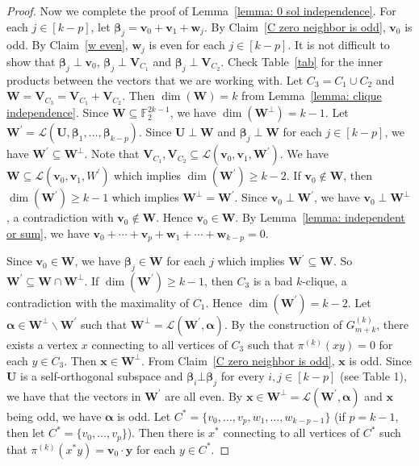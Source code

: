 \documentclass[
final
]{dmtcs-episciences}
\begin{document}
\begin{proof}
Now we complete the proof of Lemma~\ref{lemma: 0 sol independence}. For each $j\in[k-p]$, let $\boldsymbol{\beta}_j=\textbf{v}_0+\textbf{v}_1+\textbf{w}_j$. By Claim~\ref{C zero neighbor is odd},  $\textbf{v}_{0}$ is odd. By Claim~\ref{w even}, $\textbf{w}_j$ is even for each $j\in[k-p]$.
 It is not difficult to show that  $\boldsymbol{\beta}_j\perp \textbf{v}_{0}$, $\boldsymbol{\beta}_j\perp \textbf{V}_{C_1}$ and $\boldsymbol{\beta}_j\perp \textbf{V}_{C_2}$. Check Table~\ref{tab} for the inner products between the vectors that we are working with.
Let $C_3=C_1\cup C_2$ and $\mathbf{W}=\textbf{V}_{C_3}=\textbf{V}_{C_1}+\textbf{V}_{C_2}$. Then  $\dim(\mathbf{W})=k$ from Lemma~\ref{lemma: clique independence}. Since $\mathbf{W} \subseteq  \mathbb{F}_2^{2k-1}$, we have  $\dim(\mathbf{W} ^{\perp})=k-1$. Let $\mathbf{W} ^{\prime}=\mathcal{L}(\textbf{U},\boldsymbol{\beta}_1,\dots,\boldsymbol{\beta}_{k-p})$. Since $\textbf{U}\perp \mathbf{W}$ and $\boldsymbol{\beta}_j\perp \mathbf{W}$ for each $j\in[k-p]$, we have  $\mathbf{W}^{\prime}\subseteq \mathbf{W}^{\perp}$. Note that $\textbf{V}_{C_1},\textbf{V}_{C_2}\subseteq \mathcal{L}(\textbf{v}_0,\textbf{v}_1,\mathbf{W}^{\prime})$. We have $\mathbf{W} \subseteq \mathcal{L}(\textbf{v}_0,\textbf{v}_1,W^{\prime})$ which implies  $\dim(\mathbf{W}^{\prime})\ge k-2$. If $\textbf{v}_0\notin \mathbf{W}$, then  $\dim(\mathbf{W}^{\prime})\ge k-1$ which implies $\mathbf{W}^{\perp}=\mathbf{W}^{\prime}$. Since $\textbf{v}_0\perp \mathbf{W}^{\prime}$, we have $\textbf{v}_0\perp \mathbf{W}^{\perp}$, a contradiction with $\textbf{v}_0\notin \mathbf{W}$. Hence $\textbf{v}_0\in \mathbf{W}$.
By Lemma~\ref{lemma: independent or sum}, we have $ \textbf{v}_0+\cdots+\textbf{v}_p+\textbf{w}_1+\cdots+\textbf{w}_{k-p}=0 $.

Since $\textbf{v}_0\in \mathbf{W}$, we have $\boldsymbol{\beta}_j\in \mathbf{W}$ for each $j$ which implies $\mathbf{W}^{\prime}\subseteq \mathbf{W}$. So  $\mathbf{W}^{\prime}\subseteq \mathbf{W}\cap \mathbf{W}^{\perp}$.
If  $\dim(\mathbf{W}^{\prime})\ge k-1$, then $C_3$ is a bad $k$-clique,  a contradiction with the maximality of $C_1$. Hence $\dim(\mathbf{W}^{\prime})=k-2$. Let $\boldsymbol{\alpha} \in \mathbf{W}^{\perp}\backslash \mathbf{W}^{\prime}$ such that $\mathbf{W}^{\perp}=\mathcal{L}(\mathbf{W}^{\prime},\boldsymbol{\alpha})$. By the construction of $G^{(k)}_{m+k}$, there exists  a vertex $x$ connecting to all vertices of $C_3$ such that $\pi^{(k)}(xy) = 0$ for each $y \in C_3$. Then $\textbf{x}\in \mathbf{W}^{\perp}$.
From Claim~\ref{C zero neighbor is odd}, $\textbf{x}$ is odd. 
Since $\textbf{U}$ is a self-orthogonal subspace and $\boldsymbol{\beta}_i\bot \boldsymbol{\beta}_j$ for every $i,j\in [k-p]$ (see Table 1), we have that
the vectors in $\mathbf{W}^{\prime}$ are all even.  By $\textbf{x}\in \mathbf{W}^{\perp}=\mathcal{L}(\mathbf{W}^{\prime},\boldsymbol{\alpha})$ and $\textbf{x}$ being odd, we have $\boldsymbol{\alpha}$ is odd. 
Let $C^*=\{v_0,\ldots,v_p,w_1,\ldots,w_{k-p-1}\}$ (if $p=k-1$, then let $C^*=\{v_0,\ldots,v_p\}$). Then there is 
 $x^*$ connecting to all vertices of $C^*$ such that $\pi^{(k)}(x^* y) =\textbf{v}_0\cdot \textbf{y}$ for each $y\in C^*$. 
 

\end{proof}
\end{document}
